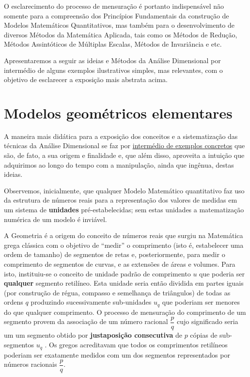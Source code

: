     O esclarecimento do processo de mensuração é portanto indispensável não somente para a compreensão dos Princípios Fundamentais da construção de Modelos Matemáticos Quantitativos, mas também para o desenvolvimento de diversos Métodos da Matemática Aplicada, tais como os Métodos de Redução, Métodos Assintóticos de Múltiplas Escalas, Métodos de Invariância e etc.

    Apresentaremos a seguir as ideias e Métodos da Análise Dimensional por intermédio de alguns exemplos ilustrativos simples, mas relevantes, com o objetivo de esclarecer a exposição mais abstrata acima.

\section{Modelos geométricos elementares}

    A maneira mais didática para a exposição dos conceitos e a sistematização das técnicas da Análise Dimensional se faz por \underline{intermédio de exemplos concretos} que são, de fato, a sua origem e finalidade e, que além disso, aproveita a intuição que adquirimos ao longo do tempo com a manipulação, ainda que ingênua, destas ideias.

    Observemos, inicialmente, que qualquer Modelo Matemático quantitativo faz uso da estrutura de números reais para a representação dos valores de medidas em um sistema de \textbf{unidades} pré-estabelecidas; sem estas unidades a matematização numérica de um modelo é inviável.

    A Geometria é a origem do conceito de números reais que surgiu na Matemática grega clássica com o objetivo de ``medir'' o comprimento (isto é, estabelecer uma ordem de tamanho) de segmentos de retas e, posteriormente, para medir o comprimento de segmentos de curvas, e as extensões de áreas e volumes. Para isto, instituiu-se o conceito de unidade padrão de comprimento \(u\) que poderia ser \textbf{qualquer} segmento retilíneo. Esta unidade seria então dividida em partes iguais (por construção de régua, compasso e semelhança de triângulos) de todas as ordens \(q\) produzindo sucessivamente sub-unidades \(u_q\) que poderiam ser menores do que qualquer comprimento. O processo de mensuração do comprimento de um segmento provem da associação de um número racional \(\dfrac{p}{q}\) cujo significado seria um um segmento obtido por \textbf{justaposição consecutiva} de \(p\) cópias de sub-segmentos \(u_q\) . Os gregos acreditavam que todos os comprimentos retilíneos poderiam ser exatamente medidos com um dos segmentos representados por números racionais \(\dfrac{p}{q}\).

